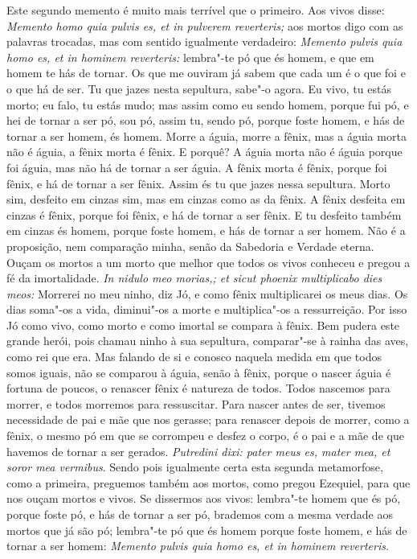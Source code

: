 Este segundo memento é muito mais terrível que o primeiro. Aos
vivos disse: \emph{Memento homo quia pulvis es, et in pulverem
reverteris;} aos mortos digo com as palavras trocadas, mas com sentido
igualmente verdadeiro: \emph{Memento pulvis quia homo es, et in hominem
reverteris:} lembra"-te pó que és homem, e que em homem te hás de tornar.
Os que me ouviram já sabem que cada um é o que foi e o que há de ser. Tu
que jazes nesta sepultura, sabe"-o agora. Eu vivo, tu estás morto; eu
falo, tu estás mudo; mas assim como eu sendo homem, porque fui pó, e hei
de tornar a ser pó, sou pó, assim tu, sendo pó, porque foste homem, e
hás de tornar a ser homem, és homem. Morre a águia, morre a fênix, mas a
águia morta não é águia, a fênix morta é fênix. E porquê? A águia morta
não é águia porque foi águia, mas não há de tornar a ser águia. A fênix
morta é fênix, porque foi fênix, e há de tornar a ser fênix. Assim és tu
que jazes nessa sepultura. Morto sim, desfeito em cinzas sim, mas em
cinzas como as da fênix. A fênix desfeita em cinzas é fênix, porque foi
fênix, e há de tornar a ser fênix. E tu desfeito também em cinzas és
homem, porque foste homem, e hás de tornar a ser homem. Não é a
proposição, nem comparação minha, senão da Sabedoria e Verdade eterna.
Ouçam os mortos a um morto que melhor que todos os vivos conheceu e
pregou a fé da imortalidade. \emph{In nidulo meo morias,; et sicut
phoenix multiplicabo dies meos:} Morrerei no meu ninho, diz Jó, e como
fênix multiplicarei os meus dias. Os dias soma"-os a vida, diminui"-os a
morte e multiplica"-os a ressurreição. Por isso Jó como vivo, como morto
e como imortal se compara à
fênix. Bem pudera este grande herói, pois chamau ninho à sua sepultura,
comparar"-se à rainha das aves, como rei que era. Mas falando de si e
conosco naquela medida em que todos somos iguais, não se comparou à
águia, senão à fênix, porque o nascer águia é fortuna de poucos, o
renascer fênix é natureza de todos. Todos nascemos para morrer, e todos
morremos para ressuscitar. Para nascer antes de ser, tivemos necessidade
de pai e mãe que nos gerasse; para renascer depois de morrer, como a
fênix, o mesmo pó em que se corrompeu e desfez o corpo, é o pai e a mãe
de que havemos de tornar a ser gerados. \emph{Putredini dixi: pater meus
es, mater mea, et soror mea vermibus}. Sendo pois igualmente certa
esta segunda metamorfose, como a primeira, preguemos também aos mortos,
como pregou Ezequiel, para que nos ouçam mortos e vivos. Se %
dissermos aos vivos: lembra"-te homem que és pó, porque foste pó, e hás
de tornar a ser pó, brademos com a mesma verdade aos mortos que já são
pó; lembra"-te pó que és homem porque foste homem, e hás de tornar a ser
homem: \emph{Memento pulvis quia homo es, et in hominem reverteris}.

